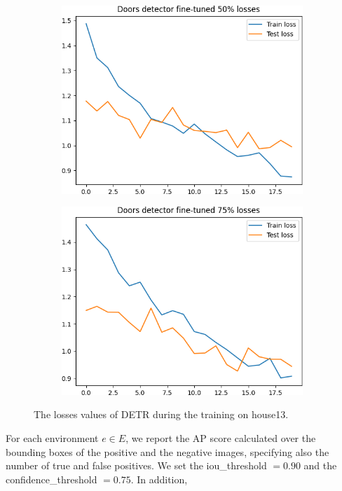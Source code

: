 \begin{figure}[h!]
\begin{subfigure}[b]{0.49\linewidth}
	\end{subfigure}
	\newline
	\newline
	\begin{subfigure}[b]{0.49\linewidth}
		\includegraphics[width=\linewidth]{images/house13_finetune50_loss.png}

	\end{subfigure}
	\hfil
	\begin{subfigure}[b]{0.49\linewidth}
		\includegraphics[width=\linewidth]{images/house13_finetune75_loss.png}

	\end{subfigure}
	\caption{The losses values of DETR during the training on house13. }
	\label{fig:house13_losses}
\end{figure}


For each environment $e \in E$, we report the AP score calculated over the bounding boxes of the positive and the negative images, specifying also the number of true and false positives. We set the \textsf{iou\_threshold} $= 0.90$ and the \textsf{confidence\_threshold} $= 0.75$. In addition,  
